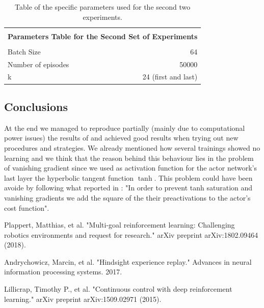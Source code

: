 \documentclass[a4paper]{report}
\begin{document}
\begin{table}[h]
\begin{center}
\begin{tabular}{|l|r|} 



\hline

\multicolumn{2}{|c|}{}\\
\multicolumn{2}{|c|}{\textbf{\large       Parameters Table for the Second Set of Experiments}}\\
\multicolumn{2}{|c|}{}\\

\hline

Batch Size 					& 64			\\
Number of episodes			& 50000			\\
k							& 24 (first and last)	\\


\hline
\end{tabular}
\end{center}
\caption{\label{exp1} Table of the specific parameters used for the second two experiments.}
\end{table}
 
\subsection{Conclusions}
At the end we managed to reproduce partially (mainly due to computational power issues) the results of \cite{her} and achieved good results when trying out new procedures and strategies. We already mentioned how several trainings showed no learning and we think that the reason behind this behaviour lies in the problem of vanishing gradient since we used as activation function for the actor network's last layer the hyperbolic tangent function $\tanh$. This problem could have been avoide by following what reported in \cite{her} :
"In order to prevent  tanh saturation and vanishing gradients we add the square of the their preactivations to the actor’s cost function". 




\begin{thebibliography}{}

Plappert, Matthias, et al. "Multi-goal reinforcement learning: Challenging robotics environments and request for research." arXiv preprint arXiv:1802.09464 (2018).

Andrychowicz, Marcin, et al. "Hindsight experience replay." Advances in neural information processing systems. 2017.

Lillicrap, Timothy P., et al. "Continuous control with deep reinforcement learning." arXiv preprint arXiv:1509.02971 (2015).

\end{thebibliography}
\end{document}
